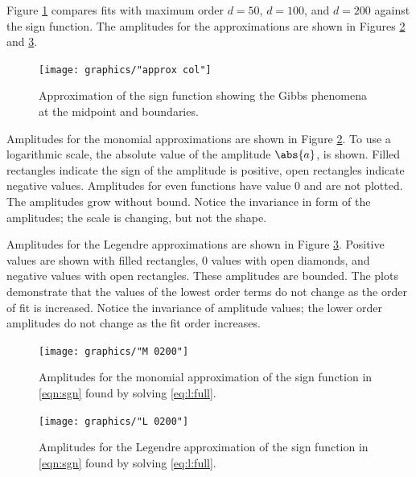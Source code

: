 \documentclass[conference]{worldcomp}
\begin{document}
Figure \ref{fig:signum approx} compares fits with maximum order $d=50$, $d=100$, and $d=200$ against the sign function. The amplitudes for the approximations are shown in Figures \ref{fig:signum approx amps monomial} and  \ref{fig:signum approx amps Legendre}. 

\begin{figure}[htbp] %
   \centering
   \texttt{[image: graphics/"approx col"]}
   \caption{Approximation of the sign function showing the Gibbs phenomena at the midpoint and boundaries.}
   \label{fig:signum approx}
\end{figure}

Amplitudes for the monomial approximations are shown in Figure \ref{fig:signum approx amps monomial}. To use a logarithmic scale, the absolute value of the amplitude $\abs{a}$, is shown. Filled rectangles indicate the sign of the amplitude is positive, open rectangles indicate negative values. Amplitudes for even functions have value 0 and are not plotted. The amplitudes grow without bound. Notice the invariance in form of the amplitudes; the scale is changing, but not the shape.

Amplitudes for the Legendre approximations are shown in Figure \ref{fig:signum approx amps Legendre}. Positive values are shown with filled rectangles, 0 values with open diamonds, and negative values with open rectangles. These amplitudes are bounded. The plots demonstrate that the values of the lowest order terms do not change as the order of fit is increased. Notice the invariance of amplitude values; the lower order amplitudes do not change as the fit order increases.


\begin{figure}[t] %
   \centering
   \texttt{[image: graphics/"M 0200"]} 
   \caption{Amplitudes for the monomial approximation of the sign function in \eqref{eqn:sgn} found by solving \eqref{eq:l:full}.}
   \label{fig:signum approx amps monomial}
\end{figure}

\begin{figure}[t] %
   \centering
   \texttt{[image: graphics/"L 0200"]} 
   \caption{Amplitudes for the Legendre approximation of the sign function in \eqref{eqn:sgn} found by solving \eqref{eq:l:full}.}
   \label{fig:signum approx amps Legendre}
\end{figure}
\end{document}
